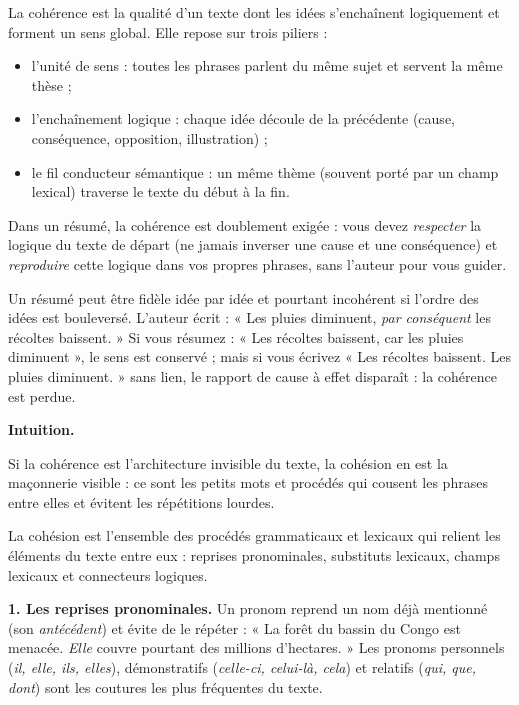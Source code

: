 \documentclass[11pt]{article}
\newcommand{\cle}[1]{{\popxbold\color{popdark}#1}}
\newcounter{popsec}
\newcounter{popsub}
\newcommand{\courssub}[1]{%
  \stepcounter{popsub}%
  \par\vspace{9pt}\noindent{\popxbold\fontsize{11.5}{13}\selectfont\color{popink}{\color{poporange}\thepopsec.\thepopsub}\hspace{6pt}#1}\par\nopagebreak\vspace{4pt}
}
\begin{document}
\begin{definition}[La cohérence]
La \cle{cohérence} est la qualité d'un texte dont les idées s'enchaînent logiquement et forment un sens global. Elle repose sur trois piliers :
\begin{itemize}
\item l'\cle{unité de sens} : toutes les phrases parlent du même sujet et servent la même thèse ;
\item l'\cle{enchaînement logique} : chaque idée découle de la précédente (cause, conséquence, opposition, illustration) ;
\item le \cle{fil conducteur sémantique} : un même thème (souvent porté par un champ lexical) traverse le texte du début à la fin.
\end{itemize}
\end{definition}

Dans un résumé, la cohérence est doublement exigée : vous devez \emph{respecter} la logique du texte de départ (ne jamais inverser une cause et une conséquence) et \emph{reproduire} cette logique dans vos propres phrases, sans l'auteur pour vous guider.

\begin{attention}
Un résumé peut être fidèle idée par idée et pourtant incohérent si l'ordre des idées est bouleversé. L'auteur écrit : « Les pluies diminuent, \emph{par conséquent} les récoltes baissent. » Si vous résumez : « Les récoltes baissent, car les pluies diminuent », le sens est conservé ; mais si vous écrivez « Les récoltes baissent. Les pluies diminuent. » sans lien, le rapport de cause à effet disparaît : la cohérence est perdue.
\end{attention}

\courssub{La cohésion : les liens matériels du texte}

\textbf{Intuition.}\par
Si la cohérence est l'architecture invisible du texte, la cohésion en est la maçonnerie visible : ce sont les petits mots et procédés qui cousent les phrases entre elles et évitent les répétitions lourdes.

\begin{definition}[La cohésion]
La \cle{cohésion} est l'ensemble des procédés grammaticaux et lexicaux qui relient les éléments du texte entre eux : reprises pronominales, substituts lexicaux, champs lexicaux et connecteurs logiques.
\end{definition}

\textbf{1. Les reprises pronominales.} Un pronom reprend un nom déjà mentionné (son \emph{antécédent}) et évite de le répéter : « La forêt du bassin du Congo est menacée. \emph{Elle} couvre pourtant des millions d'hectares. » Les pronoms personnels (\emph{il, elle, ils, elles}), démonstratifs (\emph{celle-ci, celui-là, cela}) et relatifs (\emph{qui, que, dont}) sont les coutures les plus fréquentes du texte.
\end{document}
